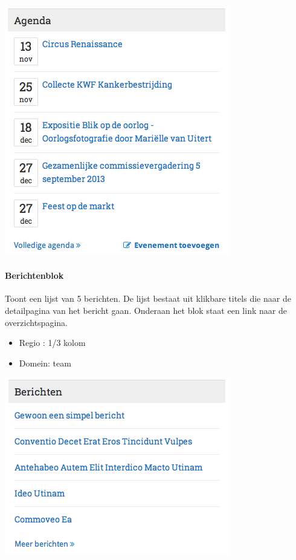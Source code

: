 \begin{center}
	\includegraphics[scale=0.5]{img/blokken/agendalist.png}
\end{center}

\paragraph{Berichtenblok}

Toont een lijst van 5 berichten. De lijst bestaat uit klikbare titels die naar de detailpagina van het bericht gaan. Onderaan het blok staat een link naar de overzichtspagina.

\begin{itemize}
\item Regio : 1/3 kolom
\item Domein: team
\end{itemize}

\begin{center}
	\includegraphics[scale=0.5]{img/blokken/berichten.png}
\end{center}

